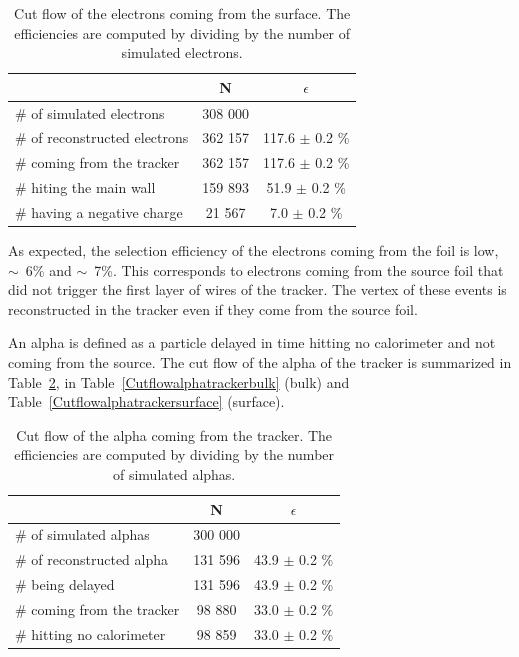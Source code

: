 \documentclass[main.tex]{subfiles}
\begin{document}
\begin{table}[h!]
\begin{center}
\begin{tabular}{l|c|c}
 & N & $\epsilon$ \\
\toprule
$\#$ of simulated electrons & 308 000 & \\
\hline
$\#$ of reconstructed electrons & 362 157 & 117.6 $\pm$ 0.2 \% \\
$\#$ coming from the tracker    & 362 157 & 117.6 $\pm$ 0.2 \%\\
$\#$ hiting the main wall       & 159 893 & 51.9 $\pm$ 0.2 \%\\
$\#$ having a negative charge   & 21 567  & 7.0 $\pm$ 0.2 \%\\
\bottomrule
\end{tabular}
\end{center}
\caption{Cut flow of the electrons coming from the surface. The efficiencies are computed by dividing by the number of simulated electrons.}
\label{Cutflowelectrontrackersurface}
\end{table}


\bigskip

\noindent As expected, the selection efficiency of the electrons coming from the foil is low, $\sim$~6\% and $\sim$~7\%. This corresponds to electrons coming from the source foil that did not trigger the first layer of wires of the tracker. The vertex of these events is reconstructed in the tracker even if they come from the source foil.  


\bigskip


\noindent An alpha is defined as a particle delayed in time hitting no calorimeter and not coming from the source. The cut flow of the alpha of the tracker is summarized in Table~\ref{Cutflowalphatrackertracker}, in Table~\ref{Cutflowalphatrackerbulk} (bulk) and Table~\ref{Cutflowalphatrackersurface} (surface).


\begin{table}[h!]
\begin{center}
\begin{tabular}{l|c|c}
 & N & $\epsilon$ \\
\toprule
$\#$ of simulated alphas & 300 000 & \\
\hline
$\#$ of reconstructed alpha & 131 596 & 43.9 $\pm$ 0.2 \%\\
$\#$ being delayed          & 131 596 & 43.9 $\pm$ 0.2 \%\\
$\#$ coming from the tracker& 98 880  & 33.0 $\pm$ 0.2 \%\\
$\#$ hitting no calorimeter & 98 859  & 33.0 $\pm$ 0.2 \%\\
\bottomrule
\end{tabular}
\end{center}
\caption{Cut flow of the alpha coming from the tracker. The efficiencies are computed by dividing by the number of simulated alphas.}
\label{Cutflowalphatrackertracker}
\end{table}
\end{document}
